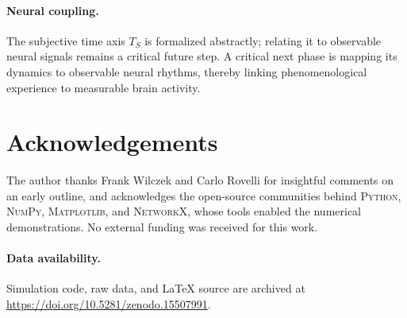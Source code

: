 \documentclass[11pt]{article}
\begin{document}
\paragraph{Neural coupling.}
The subjective time axis $T_S$ is formalized abstractly; relating it to observable neural signals remains a critical future step. A critical next phase is mapping its dynamics to observable neural rhythms, thereby linking phenomenological experience to measurable brain activity.

\section*{Acknowledgements}
The author thanks Frank Wilczek and Carlo Rovelli for insightful comments on an early outline, and acknowledges the open-source communities behind \textsc{Python}, \textsc{NumPy}, \textsc{Matplotlib}, and \textsc{NetworkX}, whose tools enabled the numerical demonstrations. No external funding was received for this work.

\paragraph{Data availability.}
Simulation code, raw data, and LaTeX source are archived at
\url{https://doi.org/10.5281/zenodo.15507991}.



\end{document}
